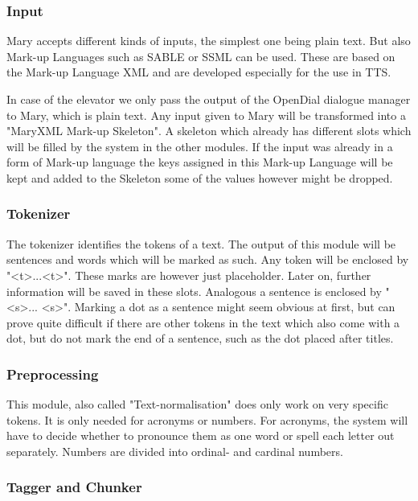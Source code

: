 \documentclass[a4paper, 12pt]{article}
\begin{document}
\subsubsection*{Input}

Mary accepts different kinds of inputs, the simplest one being plain text.
But also Mark-up Languages such as SABLE or SSML can be used. 
These are based on the Mark-up Language XML and are developed especially for the use in TTS.

In case of the elevator we only pass the output of the OpenDial dialogue manager to Mary, which is plain text.
Any input given to Mary will be transformed into a "MaryXML Mark-up Skeleton". 
A skeleton which already has different slots which will be filled by the system in the other modules.
If the input was already in a form of Mark-up language the keys assigned in this Mark-up Language will be kept and added to the Skeleton some of the values however might be dropped.

\subsubsection*{Tokenizer}

The tokenizer identifies the tokens of a text. The output of this module will be sentences and words which will be marked as such.
Any token will be enclosed by "\textless t\textgreater ...\textless  t\textgreater". 
These marks are however just placeholder. 
Later on, further information will be saved in these slots.
Analogous a sentence is enclosed by "\textless s\textgreater ... \textless s\textgreater". 
Marking a dot as a sentence might seem obvious at first, but can prove quite difficult if there are other tokens in the text which also come with a dot, but do not mark the end of a sentence, such as the dot placed after titles.

\subsubsection*{Preprocessing}

This module, also called "Text-normalisation" does only work on very specific tokens.
It is only needed for acronyms or numbers.
For acronyms, the system will have to decide whether to pronounce them as one word or spell each letter out separately.
Numbers are divided into ordinal- and cardinal numbers.

\subsubsection*{Tagger and Chunker}
\end{document}
